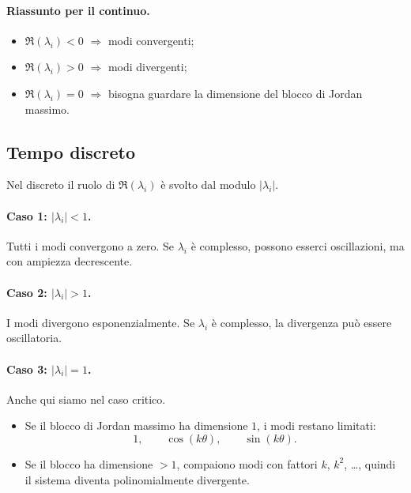 \paragraph{Riassunto per il continuo.}
\begin{itemize}
    \item $\Re(\lambda_i)<0$ $\Rightarrow$ modi convergenti;
    \item $\Re(\lambda_i)>0$ $\Rightarrow$ modi divergenti;
    \item $\Re(\lambda_i)=0$ $\Rightarrow$ bisogna guardare la dimensione del blocco di Jordan massimo.
\end{itemize}

\subsection{Tempo discreto}

Nel discreto il ruolo di $\Re(\lambda_i)$ è svolto dal modulo $|\lambda_i|$.

\paragraph{Caso 1: \texorpdfstring{$|\lambda_i|<1$}{|lambda|<1}.}
Tutti i modi convergono a zero. Se $\lambda_i$ è complesso, possono esserci oscillazioni, ma con ampiezza decrescente.

\paragraph{Caso 2: \texorpdfstring{$|\lambda_i|>1$}{|lambda|>1}.}
I modi divergono esponenzialmente. Se $\lambda_i$ è complesso, la divergenza può essere oscillatoria.

\paragraph{Caso 3: \texorpdfstring{$|\lambda_i|=1$}{|lambda|=1}.}
Anche qui siamo nel caso critico.

\begin{itemize}
    \item Se il blocco di Jordan massimo ha dimensione $1$, i modi restano limitati:
    \[
    1,\qquad \cos(k\theta),\qquad \sin(k\theta).
    \]
    \item Se il blocco ha dimensione $>1$, compaiono modi con fattori $k$, $k^2$, \dots, quindi il sistema diventa polinomialmente divergente.
\end{itemize}

